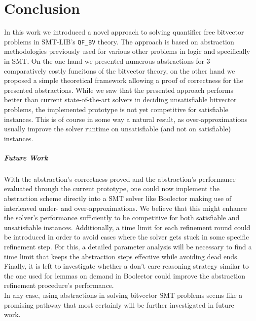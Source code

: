 \chapter{Conclusion}
\label{ch:Conclusion}
In this work we introduced a novel approach to solving quantifier free bitvector problems in SMT-LIB's \texttt{QF\_BV} theory. The approach is based on abstraction methodologies previously used for various other problems in logic and specifically in SMT.
On the one hand we presented numerous abstractions for 3 comparatively costly funcitons of the bitvector theory, on the other hand we proposed a simple theoretical framework allowing a proof of correctness for the presented abstractions.
While we saw that the presented approach performs better than current state-of-the-art solvers in deciding unsatisfiable bitvector problems, the implemented prototype is not yet competitive for satisfiable instances. This is of course in some way a natural result, as over-approximations usually improve the solver runtime on unsatisfiable (and not on satisfiable) instances.

\paragraph{Future Work}
With the abstraction's correctness proved and the abstraction's performance evaluated through the current prototype, one could now implement the abstraction scheme directly into a SMT solver like Boolector making use of interleaved under- and over-approximations. We believe that this might enhance the solver's performance sufficiently to be competitive for both satisfiable and unsatisfiable instances.
Additionally, a time limit for each refinement round could be introduced in order to avoid cases where the solver gets stuck in some specific refinement step. For this, a detailed parameter analysis will be necessary to find a time limit that keeps the abstraction steps effective while avoiding dead ends. Finally, it is left to investigate whether a don't care reasoning strategy similar to the one used for lemmas on demand in Boolector \cite{NiemetzPreinerBiere-FMCAD14} could improve the abstraction refinement procedure's performance.\\
In any case, using abstractions in solving bitvector SMT problems seems like a promising pathway that most certainly will be further investigated in future work.